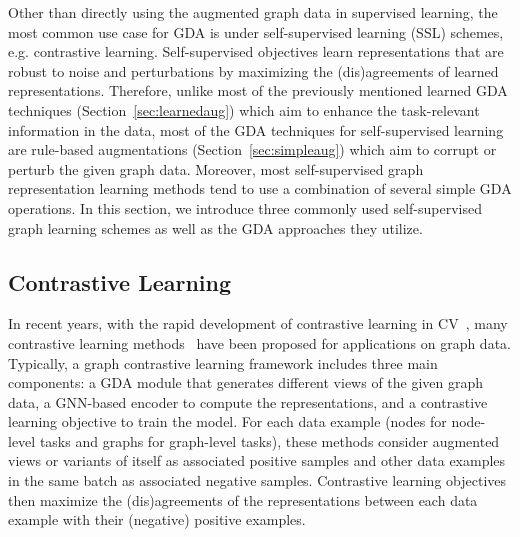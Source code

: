 \documentclass[11pt]{article}
\begin{document}
Other than directly using the augmented graph data in supervised learning, the most common use case for GDA is under self-supervised learning (SSL) schemes, e.g. contrastive learning. Self-supervised objectives learn representations that are robust to noise and perturbations by maximizing the (dis)agreements of learned representations. Therefore, unlike most of the previously mentioned learned GDA techniques (Section~\ref{sec:learnedaug}) which aim to enhance the task-relevant information in the data, most of the GDA techniques for self-supervised learning are rule-based augmentations (Section~\ref{sec:simpleaug}) which aim to corrupt or perturb the given graph data. Moreover, most self-supervised graph representation learning methods tend to use a combination of several simple GDA operations. In this section, we introduce three commonly used self-supervised graph learning schemes as well as the GDA approaches they utilize.

\subsection{Contrastive Learning}
\label{sec:contrastive}
In recent years, with the rapid development of contrastive learning in CV~\cite{chen2020simple}, many  contrastive learning methods~\cite{zhu2020deep,you2020graph,trivedi2021augmentations,xie2022self,liu2022graph,ju2022multi} have been proposed for applications on graph data.
Typically, a graph contrastive learning framework includes three main components: a GDA module that generates different views of the given graph data, a GNN-based encoder to compute the representations, and a contrastive learning objective to train the model. For each data example (nodes for node-level tasks and graphs for graph-level tasks), these methods consider augmented views or variants of itself as associated positive samples and other data examples in the same batch as associated negative samples. Contrastive learning objectives then maximize the (dis)agreements of the representations between each data example with their (negative) positive examples. 
\end{document}
